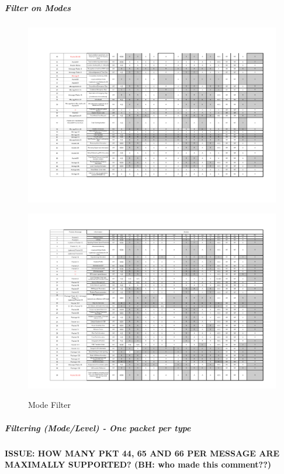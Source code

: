 \subparagraph{Filter on Modes}
\begin{figure}[hbtp]
\centering
\includegraphics [angle=90, scale=0.8]{images/FilterMode1}
\end{figure}
\begin{figure}[hbtp]
\centering
\includegraphics [angle=90, scale=0.8]{images/FilterMode2}
\end{figure}
\begin{figure}[hbtp]
\centering
\caption{Mode Filter}
\end{figure}
\newpage

\subparagraph{Filtering (Mode/Level) - One packet per type}
\textbf{ISSUE: HOW MANY PKT 44, 65 AND 66 PER MESSAGE ARE MAXIMALLY SUPPORTED? (BH: who made this comment??)}\\

